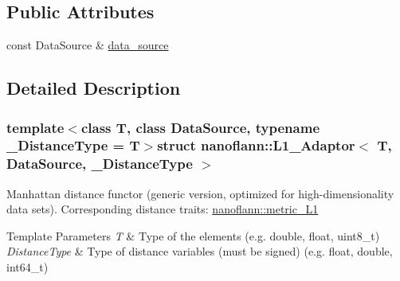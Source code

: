 \subsection*{Public Attributes}
\begin{DoxyCompactItemize}
\item 
const Data\-Source \& \hyperlink{structnanoflann_1_1_l1___adaptor_af5ffa8683071c1452a4619cce0a6f707}{data\-\_\-source}
\end{DoxyCompactItemize}


\subsection{Detailed Description}
\subsubsection*{template$<$class T, class Data\-Source, typename \-\_\-\-Distance\-Type = T$>$struct nanoflann\-::\-L1\-\_\-\-Adaptor$<$ T, Data\-Source, \-\_\-\-Distance\-Type $>$}

Manhattan distance functor (generic version, optimized for high-\/dimensionality data sets). Corresponding distance traits\-: \hyperlink{structnanoflann_1_1metric___l1}{nanoflann\-::metric\-\_\-\-L1} 
\begin{DoxyTemplParams}{Template Parameters}
{\em T} & Type of the elements (e.\-g. double, float, uint8\-\_\-t) \\
\hline
{\em Distance\-Type} & Type of distance variables (must be signed) (e.\-g. float, double, int64\-\_\-t) \\
\hline
\end{DoxyTemplParams}


